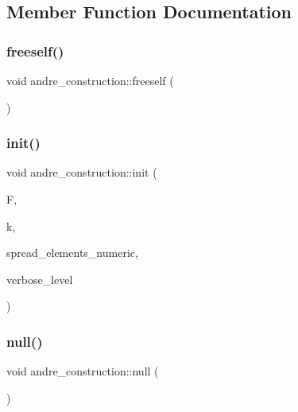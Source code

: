\subsection{Member Function Documentation}
\mbox{\label{classandre__construction_a6ac48a241be1155e18af795e08169c57}} 
\subsubsection{\texorpdfstring{freeself()}{freeself()}}
{\footnotesize\ttfamily void andre\+\_\+construction\+::freeself (\begin{DoxyParamCaption}{ }\end{DoxyParamCaption})}

\mbox{\label{classandre__construction_a8e763c87474e64d559a1dd2aa7971a4a}} 
\subsubsection{\texorpdfstring{init()}{init()}}
{\footnotesize\ttfamily void andre\+\_\+construction\+::init (\begin{DoxyParamCaption}\item[{\mbox{\hyperlink{classfinite__field}{finite\+\_\+field}} $\ast$}]{F,  }\item[{\mbox{\hyperlink{galois_8h_a09fddde158a3a20bd2dcadb609de11dc}{I\+NT}}}]{k,  }\item[{\mbox{\hyperlink{galois_8h_a09fddde158a3a20bd2dcadb609de11dc}{I\+NT}} $\ast$}]{spread\+\_\+elements\+\_\+numeric,  }\item[{\mbox{\hyperlink{galois_8h_a09fddde158a3a20bd2dcadb609de11dc}{I\+NT}}}]{verbose\+\_\+level }\end{DoxyParamCaption})}

\mbox{\label{classandre__construction_a34ed31ea42d620add994069c7ecfa4d3}} 
\subsubsection{\texorpdfstring{null()}{null()}}
{\footnotesize\ttfamily void andre\+\_\+construction\+::null (\begin{DoxyParamCaption}{ }\end{DoxyParamCaption})}

